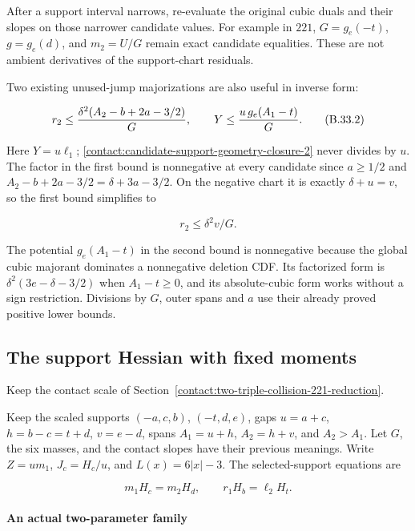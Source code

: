 After a support interval narrows, re-evaluate the original cubic duals and
their slopes on those narrower candidate values. For example in $221$,
$G=g_e(-t)$, $g=g_e(d)$, and $m_2=U/G$ remain exact candidate equalities.
These are not ambient derivatives of the support-chart residuals.

Two existing unused-jump majorizations are also useful in inverse form:

\[
 r_2\le {\delta^2(A_2-b+2a-3/2)\over G},\qquad
 Y\le {u\,g_e(A_1-t)\over G}. \tag{B.33.2}\label{contact:candidate-support-geometry-closure-2}
\]

Here $Y=u \ell_1$; \eqref{contact:candidate-support-geometry-closure-2} never divides by $u$. The factor in the first bound
is nonnegative at every candidate since $a\ge 1/2$ and
$A_2-b+2a-3/2=\delta+3a-3/2$. On the negative chart it is exactly
$\delta+u=v$, so the first bound simplifies to

\[
 \boxed{\quad r_2\le\delta^2v/G.\quad} \tag{B.33.3}\label{contact:candidate-support-geometry-closure-3}
\]

The potential $g_e(A_1-t)$ in the second bound is nonnegative because the
global cubic majorant dominates a nonnegative deletion CDF. Its factorized
form is $\delta^2(3e-\delta-3/2)$ when $A_1-t\ge 0$, and its absolute-cubic form
works without a sign restriction. Divisions by $G$, outer spans and $a$
use their already proved positive lower bounds.
\subsection{The support Hessian with fixed moments}\label{contact:two-triple-221-fixed-moment-support-hessian}
Keep the contact scale of Section~\ref{contact:two-triple-collision-221-reduction}.



Keep the scaled supports $(-a,c,b)$, $(-t,d,e)$, gaps
$u=a+c$, $h=b-c=t+d$, $v=e-d$, spans $A_1=u+h$, $A_2=h+v$, and
$A_2>A_1$. Let $G$, the six masses, and the contact slopes have their
previous meanings. Write $Z=u m_1$, $J_c=H_c/u$, and $L(x)=6|x|-3$.
The selected-support equations are

\[
 m_1H_c=m_2H_d,\qquad r_1H_b=\ell_2H_t. \tag{B.34.1}\label{contact:two-triple-221-fixed-moment-support-hessian-1}
\]

\paragraph{An actual two-parameter family}

